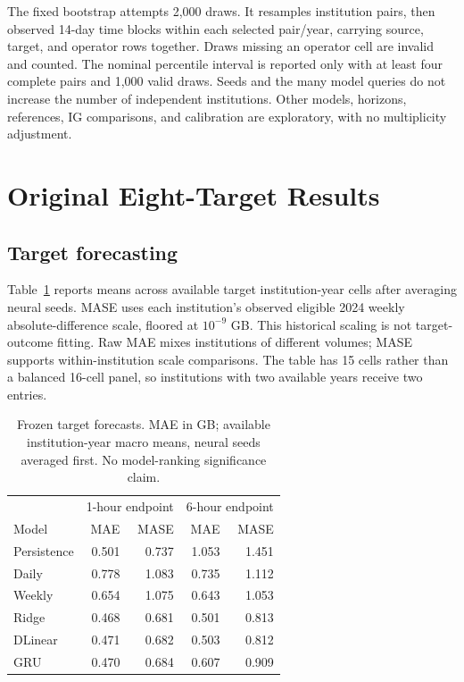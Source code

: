 \documentclass[conference]{IEEEtran}
\begin{document}
The fixed bootstrap attempts 2,000 draws. It resamples institution pairs, then observed 14-day time blocks within each selected pair/year, carrying source, target, and operator rows together. Draws missing an operator cell are invalid and counted. The nominal percentile interval is reported only with at least four complete pairs and 1,000 valid draws. Seeds and the many model queries do not increase the number of independent institutions. Other models, horizons, references, IG comparisons, and calibration are exploratory, with no multiplicity adjustment.

\section{Original Eight-Target Results}
\subsection{Target forecasting}
Table~\ref{tab:forecast} reports means across available target institution-year cells after averaging neural seeds. MASE uses each institution's observed eligible 2024 weekly absolute-difference scale, floored at $10^{-9}$ GB. This historical scaling is not target-outcome fitting. Raw MAE mixes institutions of different volumes; MASE supports within-institution scale comparisons. The table has 15 cells rather than a balanced 16-cell panel, so institutions with two available years receive two entries.

\begin{table}[t]\centering\caption{Frozen target forecasts. MAE in GB; available institution-year macro means, neural seeds averaged first. No model-ranking significance claim.}\label{tab:forecast}
\begin{tabular}{lrrrr}\toprule
&\multicolumn{2}{c}{1-hour endpoint}&\multicolumn{2}{c}{6-hour endpoint}\\
Model&MAE&MASE&MAE&MASE\\\midrule
Persistence&0.501&0.737&1.053&1.451\\
Daily&0.778&1.083&0.735&1.112\\
Weekly&0.654&1.075&0.643&1.053\\
Ridge&0.468&0.681&0.501&0.813\\
DLinear&0.471&0.682&0.503&0.812\\
GRU&0.470&0.684&0.607&0.909\\\bottomrule
\end{tabular}\end{table}
\end{document}
